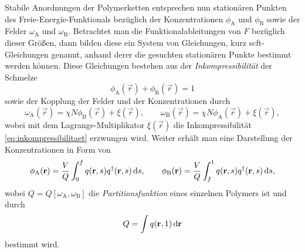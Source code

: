 \documentclass[../main.tex]{subfiles}
\begin{document}
Stabile Anordnungen der Polymerketten entsprechen nun stationären Punkten des Freie-Energie-Funktionals bezüglich der Konzentrationen $\phi_{\mathrm{A}}$ und $\phi_{\mathrm{B}}$ sowie der Felder $\omega_{\mathrm{A}}$ und $\omega_{\mathrm{B}}$.
Betrachtet man die Funktionalableitungen von $F$ bezüglich dieser Größen, dann bilden diese ein System von Gleichungen, kurz \ac{scft}-Gleichungen genannt, anhand derer die gesuchten stationären Punkte bestimmt werden können.
Diese Gleichungen bestehen aus der \emph{Inkompressibilität} der Schmelze
\begin{equation}
\label{eq:inkompressibilitaet}
    \phi_{\mathrm{A}}(\vec{r}) + \phi_{\mathrm{B}}(\vec{r}) = 1
\end{equation}%
sowie der Kopplung der Felder und der Konzentrationen durch
\begin{equation}
\label{eq:felder}
    \omega_{\mathrm{A}}(\vec{r}) = \chi N \phi_{\mathrm{B}}(\vec{r}) + \xi(\vec{r}), \qquad
    \omega_{\mathrm{B}}(\vec{r}) = \chi N \phi_{\mathrm{A}}(\vec{r}) + \xi(\vec{r}),
\end{equation}%
wobei mit dem Lagrange-Multiplikator $\xi(\vec{r})$ die Inkompressibilität \cref{eq:inkompressibilitaet} erzwungen wird.
Weiter erhält man eine Darstellung der Konzentrationen in Form von
\begin{equation}
\label{eq:konzentrationen}
    \phi_{\mathrm{A}}(\mathbf{r}) = \frac{V}{Q} \int_{0}^{f} q(\mathbf{r}, s) q^{\dagger}(\mathbf{r}, s) \mathop{}\!\mathrm{d} s, \qquad
    \phi_{\mathrm{B}}(\mathbf{r}) = \frac{V}{Q} \int_{f}^{1} q(\mathbf{r}, s) q^{\dagger}(\mathbf{r}, s) \mathop{}\!\mathrm{d} s,
\end{equation}%
wobei $Q = Q[\omega_{\mathrm{A}}, \omega_{\mathrm{B}}]$ die \emph{Partitionsfunktion} eines einzelnen Polymers ist und durch
\begin{equation}
\label{eq:partitionsfunktion}
    Q = \int q(\mathbf{r}, 1) \mathop{}\!\mathrm{d} \mathbf{r}
\end{equation}%
bestimmt wird.
\end{document}
